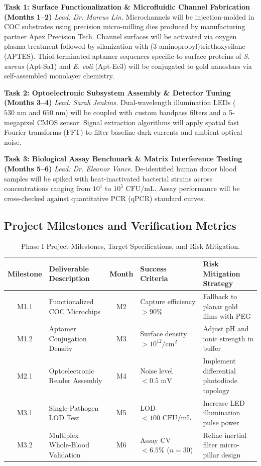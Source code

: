 \documentclass[11pt,a4paper]{scrartcl}
\begin{document}
\textbf{Task 1: Surface Functionalization \& Microfluidic Channel Fabrication (Months 1--2)}
\emph{Lead: Dr. Marcus Lin.} Microchannels will be injection-molded in COC substrates using precision micro-milling dies produced by manufacturing partner Apex Precision Tech. Channel surfaces will be activated via oxygen plasma treatment followed by silanization with (3-aminopropyl)triethoxysilane (APTES). Thiol-terminated aptamer sequences specific to surface proteins of \emph{S. aureus} (Apt-Sa1) and \emph{E. coli} (Apt-Ec3) will be conjugated to gold nanostars via self-assembled monolayer chemistry.

\textbf{Task 2: Optoelectronic Subsystem Assembly \& Detector Tuning (Months 3--4)}
\emph{Lead: Sarah Jenkins.} Dual-wavelength illumination LEDs ($530\text{ nm}$ and $650\text{ nm}$) will be coupled with custom bandpass filters and a 5-megapixel CMOS sensor. Signal extraction algorithms will apply spatial fast Fourier transforms (FFT) to filter baseline dark currents and ambient optical noise.

\textbf{Task 3: Biological Assay Benchmark \& Matrix Interference Testing (Months 5--6)}
\emph{Lead: Dr. Eleanor Vance.} De-identified human donor blood samples will be spiked with heat-inactivated bacterial strains across concentrations ranging from $10^1$ to $10^5\text{ CFU/mL}$. Assay performance will be cross-checked against quantitative PCR (qPCR) standard curves.

\subsection{Project Milestones and Verification Metrics}

\begin{table}[htbp]
\centering
\small
\caption{Phase I Project Milestones, Target Specifications, and Risk Mitigation.}
\vspace{2pt}
\begin{tabularx}{\textwidth}{c X c X X}
\toprule
\textbf{\textcolor{NavyBlue}{Milestone}} & \textbf{\textcolor{NavyBlue}{Deliverable Description}} & \textbf{\textcolor{NavyBlue}{Month}} & \textbf{\textcolor{NavyBlue}{Success Criteria}} & \textbf{\textcolor{NavyBlue}{Risk Mitigation Strategy}} \\
\midrule
M1.1 & Functionalized COC Microchips & M2 & Capture efficiency $> 90\%$ & Fallback to planar gold films with PEG \\{}
M1.2 & Aptamer Conjugation Density & M3 & Surface density $> 10^{12}/\text{cm}^2$ & Adjust pH and ionic strength in buffer \\{}
M2.1 & Optoelectronic Reader Assembly & M4 & Noise level $< 0.5\text{ mV}$ & Implement differential photodiode topology \\{}
M3.1 & Single-Pathogen LOD Test & M5 & LOD $< 100\text{ CFU/mL}$ & Increase LED illumination pulse power \\{}
M3.2 & Multiplex Whole-Blood Validation & M6 & Assay CV $< 6.5\%$ ($n=30$) & Refine inertial filter micro-pillar design \\
\bottomrule
\end{tabularx}
\end{table}
\end{document}
